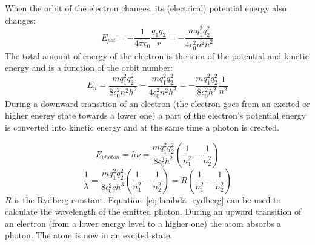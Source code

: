 When the orbit of the electron changes, its (electrical) potential energy also changes:
\begin{equation}
E_{pot}=- \frac{1}{4 \pi \epsilon_0} \frac{q_1 q_2}{r} = - \frac{m q_{1}^2 q_{2}^2}{4 \epsilon_{0}^2 n^2 h^2} \label{eq:pot}
\end{equation}
The total amount of energy of the electron is the sum of the potential and kinetic energy and is a function of the orbit number:
\begin{equation}
E_{n} = \frac{m q_{1}^2 q_{2}^2}{8 \epsilon_{0}^2 n^2 h^2} - \frac{m q_{1}^2 q_{2}^2}{4 \epsilon_{0}^2 n^2 h^2} = - \frac{m q_{1}^2 q_{2}^2}{8 \epsilon_{0}^2 h^2} \frac{1}{n^2} \label{eq:E_tot}
\end{equation}
During a downward transition of an electron (the electron goes from an excited or higher energy state towards a lower one) a part of the electron's potential energy is converted into kinetic energy and at the same time a photon is created.


\begin{equation}
E_{photon} = h \nu = \frac{m q_{1}^2 q_{2}^2}{8 \epsilon_{0}^2 h^2}\left( \frac{1}{n_{1}^2} - \frac{1}{n_{2}^2} \right) \label{eq:E_photon2}
\end{equation}
\begin{equation}
\frac{1}{\lambda} = \frac{m q_{1}^2 q_{2}^2}{8 \epsilon_{0}^2 c h^3} \left( \frac{1}{n_{1}^2} - \frac{1}{n_{2}^2} \right) = R \left( \frac{1}{n_{1}^2} - \frac{1}{n_{2}^2} \right) \label{eq:lambda_rydberg}
\end{equation}
$R$ is the Rydberg constant. Equation~\ref{eq:lambda_rydberg} can be used to calculate the wavelength of the emitted photon. During an upward transition of an electron (from a lower energy level to a higher one) the atom absorbs a photon. The atom is now in an excited state.



